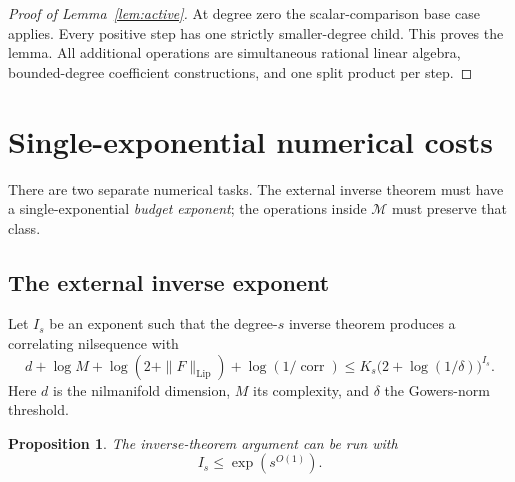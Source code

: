 \documentclass[11pt,a4paper]{article}
\newtheorem{proposition}[theorem]{Proposition}
\theoremstyle{definition}
\newcommand{\M}{\mathcal M}
\newcommand{\Lip}{\operatorname{Lip}}
\newcommand{\corr}{\operatorname{corr}}
\begin{document}
\begin{proof}[Proof of Lemma~\ref{lem:active}]
At degree zero the scalar-comparison base case applies.
Every positive step has one strictly smaller-degree child.
This proves the lemma. All additional operations are
simultaneous rational linear algebra, bounded-degree
coefficient constructions, and one split product per step.
\end{proof}

\section{Single-exponential numerical costs}\label{sec:numerical}

There are two separate numerical tasks. The external inverse
theorem must have a single-exponential \emph{budget exponent};
the operations inside \(\M\) must preserve that class.

\subsection{The external inverse exponent}

Let \(I_s\) be an exponent such that the degree-\(s\)
inverse theorem produces a correlating nilsequence with
\begin{equation}\label{eq:inverse-budget}
 d+\log M+\log(2+\|F\|_{\Lip})+\log(1/\corr)
 \le K_s\bigl(2+\log(1/\delta)\bigr)^{I_s}.
\end{equation}
Here \(d\) is the nilmanifold dimension, \(M\) its
complexity, and \(\delta\) the Gowers-norm threshold.

\begin{proposition}\label{prop:inverse}
The inverse-theorem argument can be run with
\[
 I_s\le\exp(s^{O(1)}).
\]
\end{proposition}
\end{document}
